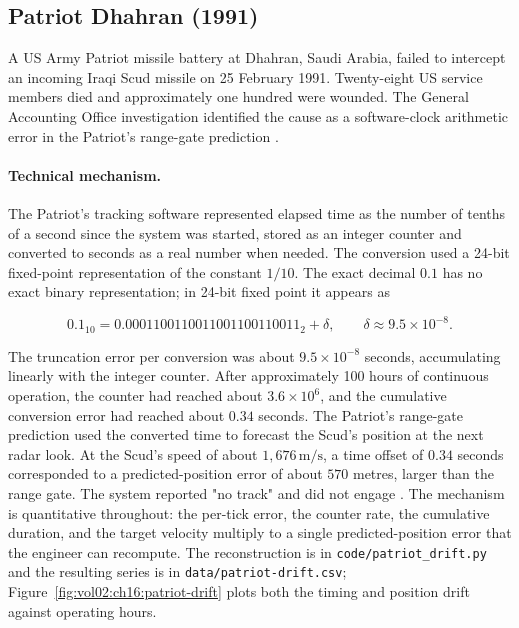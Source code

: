 \subsection{Patriot Dhahran (1991)}

A US Army Patriot missile battery at Dhahran, Saudi Arabia, failed
to intercept an incoming Iraqi Scud missile on 25 February 1991.
Twenty-eight US service members died and approximately one
hundred were wounded. The General Accounting Office investigation
identified the cause as a software-clock arithmetic error in the
Patriot's range-gate prediction \cite{acc:gao-patriot-1992}.

\paragraph{Technical mechanism.}
The Patriot's tracking software represented elapsed time as the
number of tenths of a second since the system was started, stored
as an integer counter and converted to seconds as a real number
when needed. The conversion used a 24-bit fixed-point
representation of the constant $1/10$. The exact decimal $0.1$ has
no exact binary representation; in 24-bit fixed point it appears as

\[
0.1_{10} = 0.0001100110011001100110011_{2} + \delta,
\qquad \delta \approx 9.5 \times 10^{-8}.
\]

The truncation error per conversion was about $9.5 \times 10^{-8}$
seconds, accumulating linearly with the integer counter. After
approximately 100 hours of continuous operation, the counter had
reached about $3.6 \times 10^{6}$, and the cumulative conversion
error had reached about $0.34$ seconds. The Patriot's range-gate
prediction used the converted time to forecast the Scud's position
at the next radar look. At the Scud's speed of about $1{,}676
\, \text{m}/\text{s}$, a time offset of $0.34$ seconds
corresponded to a predicted-position error of about $570$ metres,
larger than the range gate. The system reported "no track" and did
not engage \cite{acc:gao-patriot-1992}. The mechanism is
quantitative throughout: the per-tick error, the counter rate, the
cumulative duration, and the target velocity multiply to a single
predicted-position error that the engineer can recompute. The
reconstruction is in
\texttt{code/patriot\_drift.py} and the resulting series is in
\texttt{data/patriot-drift.csv};
Figure~\ref{fig:vol02:ch16:patriot-drift} plots both the timing and
position drift against operating hours.




